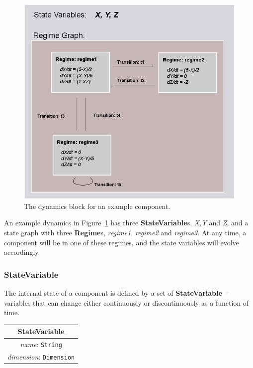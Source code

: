 \documentclass{article}
\newcommand{\StateVariable}{{\bf{StateVariable}}\xspace}
\newcommand{\StateVariables}{{\bf{StateVariable}}s\xspace}
\newcommand{\Regimes}{{\bf{Regime}}s\xspace}
\begin{document}
\begin{figure}[htb!]
\center
\includegraphics[width=14cm]{images/SimpleRegimeGraph.png}
\protect\caption{The dynamics block for an example component.}
\label{SimpleRegimeGraph}
\end{figure}

An example dynamics in Figure~\ref{SimpleRegimeGraph} has three \StateVariables,
\emph{X,Y} and \emph{Z}, and a state graph with three \Regimes, \emph{regime1},
\emph{regime2} and \emph{regime3}. At any time, a component will be in one of
these regimes, and the state variables will evolve accordingly.

\subsubsection{StateVariable}
\label{state-var}

The internal state of a component is defined by a set of \StateVariable
-- variables that can change either continuously or discontinuously as a
function of time.

\begin{table}[htb]
\center
\begin{tabular}{|c|}
\hline
\hline
StateVariable \\
\hline
\hline
{\em name}: {\tt String} \\
\hline
{\em dimension}: {\tt Dimension} \\
\hline
\end{tabular}
\end{table}
\end{document}
